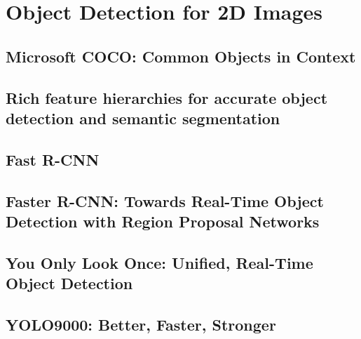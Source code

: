 \documentclass[a4paper,12pt]{article}
\begin{document}
 
\section{Object Detection for 2D Images}

\subsection{Microsoft COCO: Common Objects in Context \cite{DBLP:journals/corr/LinMBHPRDZ14} }
\subsection{Rich feature hierarchies for accurate object detection and semantic
               segmentation\cite{DBLP:journals/corr/GirshickDDM13}}
\subsection{Fast R-CNN\cite{DBLP:conf/iccv/Girshick15}}
\subsection{Faster R-CNN: Towards Real-Time Object Detection with Region Proposal
               Networks\cite{DBLP:conf/nips/RenHGS15}}
\subsection{You Only Look Once: Unified, Real-Time Object Detection\cite{DBLP:journals/corr/RedmonDGF15}}
\subsection{YOLO9000: Better, Faster, Stronger\cite{DBLP:journals/corr/RedmonF16}}

               


  
 
\end{document}
